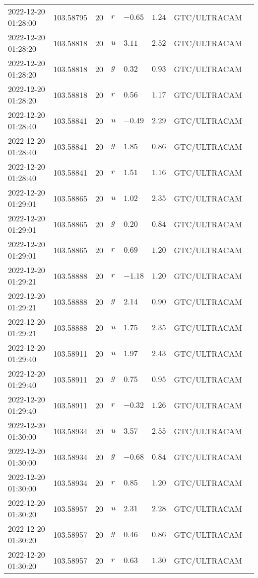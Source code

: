 \documentclass{nature_plusfigure}
\begin{document}
\begin{supplement}
\begin{center}
\begin{longtable}{llllllll}
2022-12-20 01:28:00 & 103.58795 & 20 & $r$ & $-0.65$ & $1.24$ & GTC/ULTRACAM &  \\ 
2022-12-20 01:28:20 & 103.58818 & 20 & $u$ & $3.11$ & $2.52$ & GTC/ULTRACAM &  \\ 
2022-12-20 01:28:20 & 103.58818 & 20 & $g$ & $0.32$ & $0.93$ & GTC/ULTRACAM &  \\ 
2022-12-20 01:28:20 & 103.58818 & 20 & $r$ & $0.56$ & $1.17$ & GTC/ULTRACAM &  \\ 
2022-12-20 01:28:40 & 103.58841 & 20 & $u$ & $-0.49$ & $2.29$ & GTC/ULTRACAM &  \\ 
2022-12-20 01:28:40 & 103.58841 & 20 & $g$ & $1.85$ & $0.86$ & GTC/ULTRACAM &  \\ 
2022-12-20 01:28:40 & 103.58841 & 20 & $r$ & $1.51$ & $1.16$ & GTC/ULTRACAM &  \\ 
2022-12-20 01:29:01 & 103.58865 & 20 & $u$ & $1.02$ & $2.35$ & GTC/ULTRACAM &  \\ 
2022-12-20 01:29:01 & 103.58865 & 20 & $g$ & $0.20$ & $0.84$ & GTC/ULTRACAM &  \\ 
2022-12-20 01:29:01 & 103.58865 & 20 & $r$ & $0.69$ & $1.20$ & GTC/ULTRACAM &  \\ 
2022-12-20 01:29:21 & 103.58888 & 20 & $r$ & $-1.18$ & $1.20$ & GTC/ULTRACAM &  \\ 
2022-12-20 01:29:21 & 103.58888 & 20 & $g$ & $2.14$ & $0.90$ & GTC/ULTRACAM &  \\ 
2022-12-20 01:29:21 & 103.58888 & 20 & $u$ & $1.75$ & $2.35$ & GTC/ULTRACAM &  \\ 
2022-12-20 01:29:40 & 103.58911 & 20 & $u$ & $1.97$ & $2.43$ & GTC/ULTRACAM &  \\ 
2022-12-20 01:29:40 & 103.58911 & 20 & $g$ & $0.75$ & $0.95$ & GTC/ULTRACAM &  \\ 
2022-12-20 01:29:40 & 103.58911 & 20 & $r$ & $-0.32$ & $1.26$ & GTC/ULTRACAM &  \\ 
2022-12-20 01:30:00 & 103.58934 & 20 & $u$ & $3.57$ & $2.55$ & GTC/ULTRACAM &  \\ 
2022-12-20 01:30:00 & 103.58934 & 20 & $g$ & $-0.68$ & $0.84$ & GTC/ULTRACAM &  \\ 
2022-12-20 01:30:00 & 103.58934 & 20 & $r$ & $0.85$ & $1.20$ & GTC/ULTRACAM &  \\ 
2022-12-20 01:30:20 & 103.58957 & 20 & $u$ & $2.31$ & $2.28$ & GTC/ULTRACAM &  \\ 
2022-12-20 01:30:20 & 103.58957 & 20 & $g$ & $0.46$ & $0.86$ & GTC/ULTRACAM &  \\ 
2022-12-20 01:30:20 & 103.58957 & 20 & $r$ & $0.63$ & $1.30$ & GTC/ULTRACAM &  \\ 

\end{longtable}
\end{center}
\end{supplement}
\end{document}
